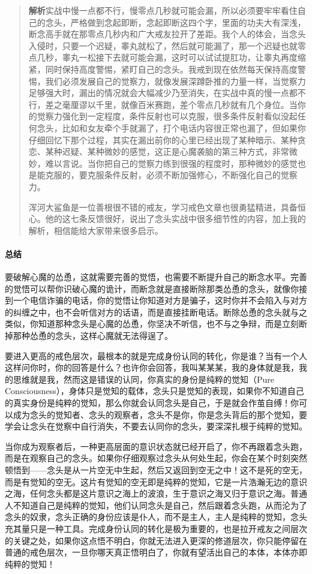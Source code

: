 \begin{quotation}
\begin{itemize}
              \textbf{解析}实战中慢一点都不行，慢零点几秒就可能会漏，所以必须要牢牢看住自己的念头，严格做到念起即断，念起即断这四个字，里面的功夫大有深浅，断念高手就在那零点几秒内和广大戒友拉开了差距。我个人的体会，当念头入侵时，只要一个迟疑，睾丸就松了，然后就可能漏了，那一个迟疑也就零点几秒，睾丸一松接下去就可能会漏，这时可以试试提肛功，让睾丸再度缩紧，同时保持高度警惕，紧盯自己的念头。我戒到现在依然每天保持高度警惕，我们必须发展自己的觉察力，就像发展深蹲卧推的力量一样，当觉察力足够强大时，漏出的情况就会大幅减少乃至消失，在实战中真的慢一点都不行，差之毫厘谬以千里，就像百米赛跑，差个零点几秒就有几个身位。当你的觉察力强化到一定程度，条件反射也可以克服，很多条件反射看似没起任何念头，比如和女友牵个手就漏了，打个电话内容很正常也漏了，但如果你仔细回忆下那个过程，其实在漏出前你的心里已经出现了某种暗示、某种贪恋、某种迟疑、某种微妙的感觉，这正是心魔袭脑的第三种方式，非常微妙，难以言说。当你把自己的觉察力练到很强的程度时，那种微妙的感觉也是能克服的，要克服条件反射，必须不断加强修心，不断强化自己的觉察力。
    \end{itemize}

    浑河大鲨鱼是一位善根很不错的戒友，学习戒色文章也很勇猛精进，具备恒心。他的这七条反馈很好，说出了念头实战中很多细节性的内容，加上我的解析，相信能给大家带来很多启示。
\end{quotation}

\paragraph*{总结}

要破解心魔的怂恿，这就需要完善的觉悟，也需要不断提升自己的断念水平。完善的觉悟可以帮你识破心魔的诡计，而断念就是直接断除那类怂恿的念头，就像你接到一个电信诈骗的电话，你的觉悟让你知道对方是骗子，这时你并不会陷入与对方的纠缠之中，也不会听信对方的话语，而是直接挂断电话。断除怂恿的念头就与之类似，你知道那种念头是心魔的怂恿，你坚决不听信，也不与之争辩，而是立刻断掉那种怂恿的念头，这样心魔就无法得逞了。

要进入更高的戒色层次，最根本的就是完成身份认同的转化，你是谁？当有一个人这样问你时，你的回答是什么？也许你会回答，我叫某某某，我的身体就是我，我的思维就是我，然而这是错误的认同，你真实的身份是纯粹的觉知（Pure Consciousness），身体只是觉知的载体，念头只是觉知的表现，如果你不知道自己的真实身份是纯粹的觉知，那么你就会认同念头是自己，于是就会作茧自缚！你可以成为念头的觉知者、念头的观察者，念头不是你，你是念头背后的那个觉知，要学会让念头在觉察中自行消失，不要去认同你的念头，要深深扎根于纯粹的觉知。

当你成为观察者后，一种更高层面的意识状态就已经开启了，你不再跟着念头跑，而是在观察自己的念头。如果你仔细观察过念头从何处生起，你会在某个时刻突然顿悟到——念头是从一片空无中生起，然后又返回到空无之中！这不是死的空无，而是有觉知的空无。这片有觉知的空无即是纯粹的觉知，它是一片浩瀚无边的意识之海，任何念头都是这片意识之海上的波浪，生于意识之海又归于意识之海。普通人不知道自己是纯粹的觉知，他们认同念头是自己，然后跟着念头跑，从而沦为了念头的奴隶，念头正确的身份应该是仆人，而不是主人，主人是纯粹的觉知，念头充其量只是一种工具。完成身份认同的转化是极为重要的，也是拉开戒友之间层次的关键之处，如果你这点悟不明白，你就无法进入更深的修道层次，你只能停留在普通的戒色层次，一旦你哪天真正悟明白了，你就有望活出自己的本体，本体亦即纯粹的觉知！

